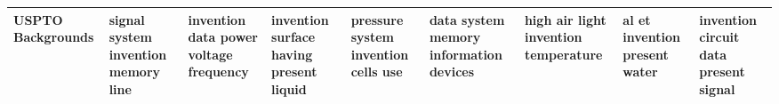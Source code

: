 \documentclass[11pt,a4paper]{article}
\begin{document}
\begin{appendices}
\begin{table*}[htp]
\begin{tiny}
\begin{tabular}{|p{}|p{}|p{}|p{}|p{}|p{}|p{}|p{}|p{}|}
USPTO Backgrounds & signal \newline system \newline invention \newline memory \newline line & invention \newline data \newline power \newline voltage \newline frequency & invention \newline surface \newline having \newline present \newline liquid & pressure \newline system \newline invention \newline cells \newline use & data \newline system \newline memory \newline information \newline devices & high \newline air \newline light \newline invention \newline temperature & al \newline et \newline invention \newline present \newline water & invention \newline circuit \newline data \newline present \newline signal\\\hline

\end{tabular}
\end{tiny}
\end{table*}
\end{appendices}
\end{document}
